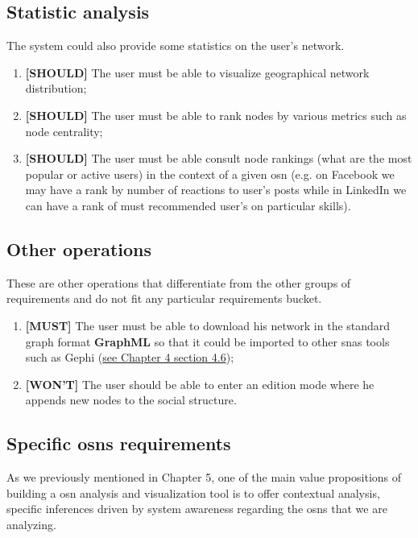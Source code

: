 \subsection{Statistic analysis}

The system could also provide some statistics on the user's network.

\begin{enumerate}
    \item \textbf{[SHOULD]} The user must be able to visualize geographical network distribution;
    \item \textbf{[SHOULD]} The user must be able to rank nodes by various metrics such as node centrality;
    \item \textbf{[SHOULD]} The user must be able consult node rankings (what are the most popular or active users) in the context of a given \gls{osn} (e.g. on Facebook we may have a rank by number of reactions to user's posts while in LinkedIn we can have a rank of must recommended user's on particular skills).
\end{enumerate}

\subsection{Other operations}

These are other operations that differentiate from the other groups of requirements and do not fit any particular requirements bucket.

\begin{enumerate}
    \item \textbf{[MUST]} The user must be able to download his network in the standard graph format \textbf{GraphML} \cite{brandes2001graphml} so that it could be imported to other \glspl{sna} tools such as Gephi (\hyperref[sec:snas]{see Chapter 4 section 4.6});
    \item \textbf{[WON'T]} The user should be able to enter an edition mode where he appends new nodes to the social structure.
\end{enumerate}


\subsection{Specific \glspl{osn} requirements}

As we previously mentioned in Chapter 5, one of the main value propositions of building a \gls{osn} analysis and visualization tool is to offer contextual analysis, specific inferences driven by system awareness regarding the \glspl{osn} that we are analyzing.

